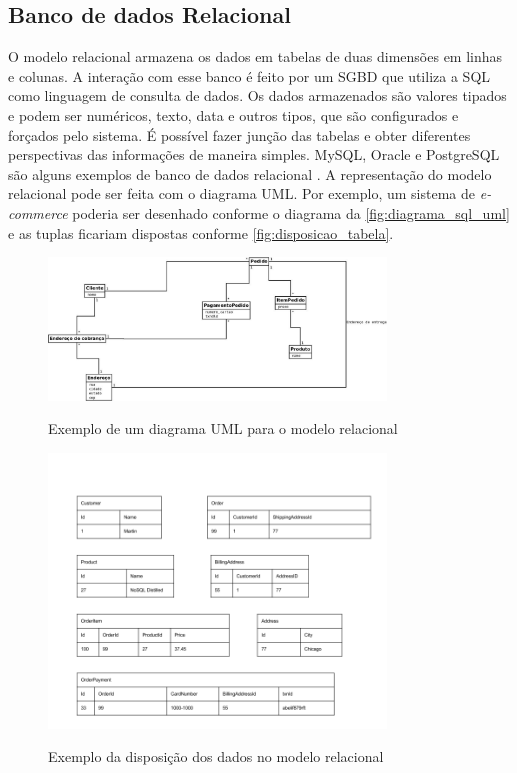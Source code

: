 \subsection{Banco de dados Relacional}
\label{subsec:relationaldatabasetype}
O modelo relacional armazena os dados em tabelas de duas dimensões em linhas e colunas. A interação com esse banco é feito por um \ac{SGBD} que utiliza a \ac{SQL} como linguagem de consulta de dados. Os dados armazenados são valores tipados e podem ser numéricos, texto, data e outros tipos, que são configurados e forçados pelo sistema. É possível fazer junção das tabelas e obter diferentes perspectivas das informações de maneira simples. MySQL, Oracle e PostgreSQL são alguns exemplos de banco de dados relacional \cite{SDSW}.
A representação do modelo relacional pode ser feita com o diagrama \ac{UML}. Por exemplo, um sistema de \textit{e-commerce} poderia ser desenhado conforme o diagrama da \autoref{fig:diagrama_sql_uml} e as tuplas ficariam dispostas conforme \autoref{fig:disposicao_tabela}.
\begin{figure}[H]
    \centering
    \caption{Exemplo de um diagrama \ac{UML} para o modelo relacional}
    \includegraphics[width=0.8\textwidth]{./04-figuras/diagrama_sql_uml.jpg}
    \label{fig:diagrama_sql_uml}
\end{figure}
\begin{figure}[H]
    \centering
    \caption{Exemplo da disposição dos dados no modelo relacional}
    \includegraphics[width=0.8\textwidth]{./04-figuras/disposicao_dados_tabela.png}
    \label{fig:disposicao_tabela}
\end{figure}


